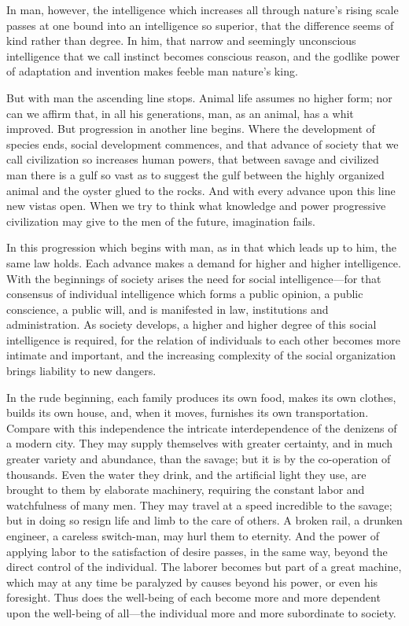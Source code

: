\documentclass{book}
\begin{document}
In man, however, the intelligence which increases all through nature’s rising scale passes at one bound into an intelligence so superior, that the difference seems of kind rather than degree. In him, that narrow and seemingly unconscious intelligence that we call instinct becomes conscious reason, and the godlike power of adaptation and invention makes feeble man nature’s king.

But with man the ascending line stops. Animal life assumes no higher form; nor can we affirm that, in all his generations, man, as an animal, has a whit improved. But progression in another line begins. Where the development of species ends, social development commences, and that advance of society that we call civilization so increases human powers, that between savage and civilized man there is a gulf so vast as to suggest the gulf between the highly organized animal and the oyster glued to the rocks. And with every advance upon this line new vistas open. When we try to think what knowledge and power progressive civilization may give to the men of the future, imagination fails.

In this progression which begins with man, as in that which leads up to him, the same law holds. Each advance makes a demand for higher and higher intelligence. With the beginnings of society arises the need for social intelligence—for that consensus of individual intelligence which forms a public opinion, a public conscience, a public will, and is manifested in law, institutions and administration. As society develops, a higher and higher degree of this social intelligence is required, for the relation of individuals to each other becomes more intimate and important, and the increasing complexity of the social organization brings liability to new dangers.

In the rude beginning, each family produces its own food, makes its own clothes, builds its own house, and, when it moves, furnishes its own transportation. Compare with this independence the intricate interdependence of the denizens of a modern city. They may supply themselves with greater certainty, and in much greater variety and abundance, than the savage; but it is by the co-operation of thousands. Even the water they drink, and the artificial light they use, are brought to them by elaborate machinery, requiring the constant labor and watchfulness of many men. They may travel at a speed incredible to the savage; but in doing so resign life and limb to the care of others. A broken rail, a drunken engineer, a careless switch-man, may hurl them to eternity. And the power of applying labor to the satisfaction of desire passes, in the same way, beyond the direct control of the individual. The laborer becomes but part of a great machine, which may at any time be paralyzed by causes beyond his power, or even his foresight. Thus does the well-being of each become more and more dependent upon the well-being of all—the individual more and more subordinate to society.
\end{document}
